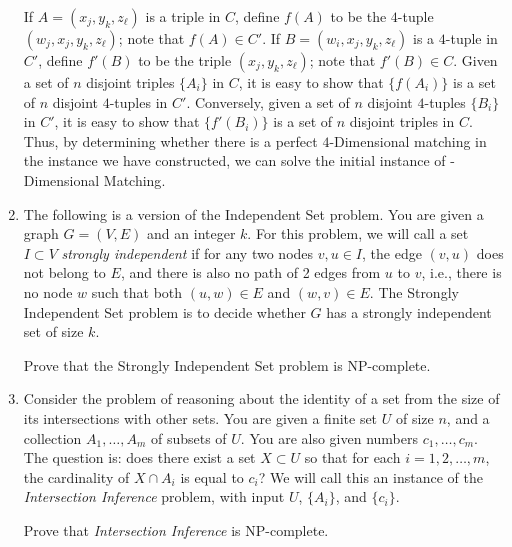 \documentclass[12pt]{article}
\begin{document}
\begin{enumerate}
{If $A = (x_j,y_k,z_\ell)$ is a triple in $C$, define $f(A)$ to be
the $4$-tuple $(w_j,x_j, y_k, z_\ell)$; note that $f(A) \in C'$.
If $B = (w_i, x_j, y_k, z_\ell)$ is a $4$-tuple in $C'$,
define $f'(B)$ to be the triple $(x_j,y_k,z_\ell)$; note that $f'(B) \in C$.
Given a set of $n$ disjoint triples $\{A_i\}$ in $C$,
it is easy to show that $\{f(A_i)\}$ is a set of $n$ disjoint
$4$-tuples in $C'$.
Conversely, given a set of $n$ disjoint $4$-tuples $\{B_i\}$
in $C'$, it is easy to show that $\{f'(B_i)\}$ is a set of $n$ disjoint
triples in $C$.
Thus, by determining whether there is a perfect $4$-Dimensional
matching in the instance we have constructed, we can solve
the initial instance of {-Dimensional Matching}.

}


\item

The following is a version of the {\sc Independent Set}
problem. You are given a graph $G=(V,E)$ and an integer $k$. For this
problem, we will call a set $I \subset V$ {\em strongly independent}
if for any two nodes $v,u \in I$, the edge $(v,u)$ does not
belong to $E$, and there is also no path of 2 edges from $u$ to $v$,
i.e., there is no node $w$ such that both $(u,w) \in E$ and $(w,v)\in E$.
The {\sc Strongly Independent Set} problem is to decide whether $G$ has a
strongly independent set of size $k$.

Prove that the {\sc Strongly Independent Set} problem is NP-complete.




\item

Consider the problem of reasoning about the identity of
a set from the size of its intersections with other sets.
You are given a finite set $U$ of size $n$, and
a collection $A_1, \ldots, A_m$ of subsets of $U$.
You are also given numbers $c_1, \ldots, c_m$.
The question is: does there exist a set $X \subset U$
so that for each $i = 1, 2, \ldots, m$,
the cardinality of $X \cap A_i$ is equal to $c_i$?
We will call this an instance of the
{\em Intersection Inference} problem,
with input $U$, $\{A_i\}$, and $\{c_i\}$.

Prove that {\em Intersection Inference} is NP-complete.




\end{enumerate}
\end{document}
